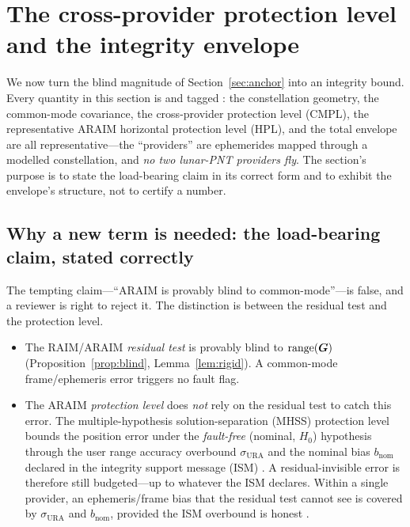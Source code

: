 \section{The cross-provider protection level and the integrity envelope}
\label{sec:cmpl}

We now turn the blind magnitude of Section~\ref{sec:anchor} into an integrity bound.
Every quantity in this section is \Modelled{} and tagged \modtag{}: the constellation
geometry, the common-mode covariance, the cross-provider protection level (CMPL), the
representative ARAIM horizontal protection level (HPL), and the total envelope are all
representative---the ``providers'' are ephemerides mapped through a modelled
constellation, and \emph{no two lunar-PNT providers fly}. The section's purpose is to
state the load-bearing claim in its correct form and to exhibit the envelope's
structure, not to certify a number.

\subsection{Why a new term is needed: the load-bearing claim, stated correctly}
\label{sec:loadbearing}

The tempting claim---``ARAIM is provably blind to common-mode''---is false, and a
reviewer is right to reject it. The distinction is between the residual test and the
protection level.

\begin{itemize}
  \item The RAIM/ARAIM \emph{residual test} is provably blind to $\operatorname{range}(\bm{G})$
  (Proposition~\ref{prop:blind}, Lemma~\ref{lem:rigid}). A common-mode frame/ephemeris
  error triggers no fault flag.

  \item The ARAIM \emph{protection level} does \emph{not} rely on the residual test to
  catch this error. The multiple-hypothesis solution-separation (MHSS) protection level
  bounds the position error under the \emph{fault-free} (nominal, $H_0$) hypothesis
  through the user range accuracy overbound $\sigma_{\mathrm{URA}}$ and the nominal bias
  $b_{\mathrm{nom}}$ declared in the integrity support message (ISM)
  \citep{blanch2015,wgc2016araim,decleene2000}. A residual-invisible error is therefore
  still budgeted---up to whatever the ISM declares. Within a single provider, an
  ephemeris/frame bias that the residual test cannot see is covered by
  $\sigma_{\mathrm{URA}}$ and $b_{\mathrm{nom}}$, provided the ISM overbound is honest
  \citep{montenbruck2018sisre}.
\end{itemize}

